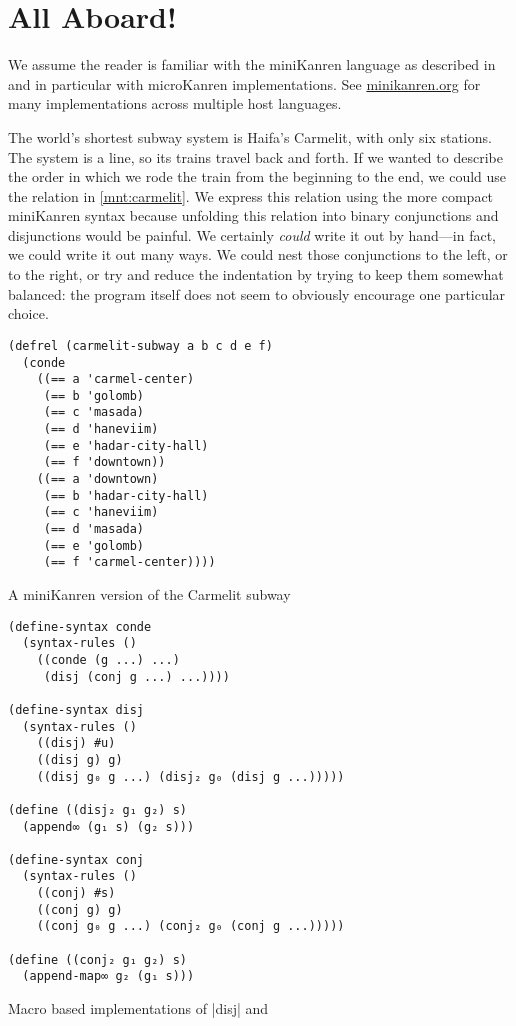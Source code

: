 \documentclass[sigplan,draft,balance,pbalance,natbib=false]{acmart}
\begin{document}
\section{All Aboard!}\label{sec:all-aboard}

We assume the reader is familiar with the miniKanren language as
described in  and in particular with
microKanren implementations. See \href{minikanren.org}{minikanren.org}
for many implementations across multiple host languages.

The world's shortest subway system is Haifa's Carmelit, with only
six stations. The system is a line, so its trains travel back and
forth. If we wanted to describe the order in which we rode the train
from the beginning to the end, we could use the
 relation in \cref{mnt:carmelit}. We
express this relation using the more compact miniKanren syntax because
unfolding this relation into binary conjunctions and disjunctions
would be painful. We certainly \emph{could} write it out by hand---in
fact, we could write it out many ways. We could nest those
conjunctions to the left, or to the right, or try and reduce the
indentation by trying to keep them somewhat balanced: the program
itself does not seem to obviously encourage one particular choice.

\begin{listing}
  \begin{verbatim}
(defrel (carmelit-subway a b c d e f)
  (conde
    ((== a 'carmel-center)
     (== b 'golomb)
     (== c 'masada)
     (== d 'haneviim)
     (== e 'hadar-city-hall)
     (== f 'downtown))
    ((== a 'downtown)
     (== b 'hadar-city-hall)
     (== c 'haneviim)
     (== d 'masada)
     (== e 'golomb)
     (== f 'carmel-center))))
  \end{verbatim}
  \caption{A miniKanren version of the Carmelit subway}
  \label{mnt:carmelit}
\end{listing}

\begin{listing}
  \begin{verbatim}
(define-syntax conde
  (syntax-rules ()
    ((conde (g ...) ...)
     (disj (conj g ...) ...))))

(define-syntax disj
  (syntax-rules ()
    ((disj) #u)
    ((disj g) g)
    ((disj g₀ g ...) (disj₂ g₀ (disj g ...)))))

(define ((disj₂ g₁ g₂) s)
  (append∞ (g₁ s) (g₂ s)))

(define-syntax conj
  (syntax-rules ()
    ((conj) #s)
    ((conj g) g)
    ((conj g₀ g ...) (conj₂ g₀ (conj g ...)))))

(define ((conj₂ g₁ g₂) s)
  (append-map∞ g₂ (g₁ s)))
  \end{verbatim}
  \caption{Macro based implementations of  \rackinline|disj| and  }
  \label{mnt:conj-and-disj-implementation}
\end{listing}
\end{document}
